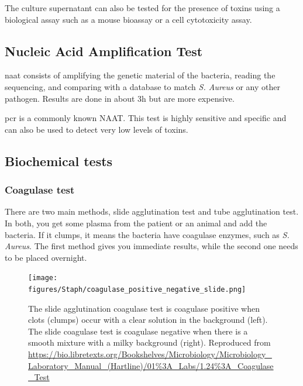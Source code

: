 The culture supernatant can also be tested for the presence of toxins using a biological assay such as a mouse bioassay or a cell cytotoxicity assay.

\subsection{Nucleic Acid Amplification Test}

\gls{naat} consists of amplifying the genetic material of the bacteria, reading the sequencing, and comparing with a database to match \textit{S. Aureus} or any other pathogen. Results are done in about 3h but are more expensive.

\gls{pcr} is a commonly known NAAT. This test is highly sensitive and specific and can also be used to detect very low levels of toxins.

\subsection{Biochemical tests}

\subsubsection{Coagulase test}

There are two main methods, slide agglutination test and  tube agglutination test. In both, you get some plasma from the patient or an animal and add the bacteria. If it clumps, it means the bacteria have coagulase enzymes, such as \textit{S. Aureus}. The first method gives you immediate results, while the second one needs to be placed overnight.

    \begin{figure}[h]
        \centering
            \texttt{[image: figures/Staph/coagulase\_positive\_negative\_slide.png]} 
        \caption{The slide agglutination coagulase test is coagulase positive when clots (clumps) occur with a clear solution in the background (left). The slide coagulase test is coagulase negative when there is a smooth mixture with a milky background (right). Reproduced from \url{ https://bio.libretexts.org/Bookshelves/Microbiology/Microbiology\_Laboratory\_Manual\_(Hartline)/01\%3A\_Labs/1.24\%3A\_Coagulase_Test}}
        \label{figure:coagualaseSlide}
    \end{figure}


